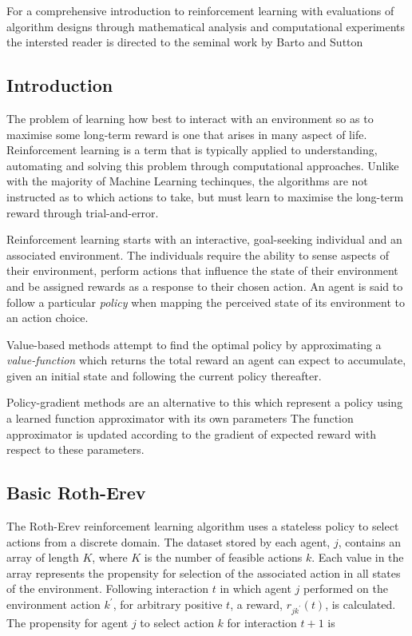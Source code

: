 For a comprehensive introduction to reinforcement learning with evaluations of
algorithm designs through mathematical analysis and computational experiments
the intersted reader is directed to the seminal work by Barto and Sutton

\subsection{Introduction}
The problem of learning how best to interact with an environment so as to
maximise some long-term reward is one that arises in many aspect of life.
Reinforcement learning is a term that is typically applied to
understanding, automating and solving this problem through computational
approaches. Unlike with the majority of Machine Learning techinques, the
algorithms are not instructed as to which actions to take, but must learn to
maximise the long-term reward through trial-and-error.

Reinforcement learning starts with an interactive, goal-seeking individual and
an associated environment.  The individuals require the ability to sense
aspects of their environment, perform actions that influence the state of their
environment and be assigned rewards as a response to their chosen action.  An
agent is said to follow a particular \textit{policy} when mapping the
perceived state of its environment to an action choice.

Value-based methods attempt to find the optimal policy by
approximating a \textit{value-function} which returns the total reward an
agent can expect to accumulate, given an initial state and following the
current policy thereafter.

Policy-gradient methods are an alternative to this which
represent a policy using a learned function approximator with its own
parameters %
The function approximator is updated according to the gradient of expected
reward with respect to these parameters.

\subsection{Basic Roth-Erev}
\label{sec:rotherev}
The Roth-Erev reinforcement learning algorithm uses a stateless policy to
select actions from a discrete domain\cite{roth:games,roth:aer}.  The dataset
stored by each agent, $j$, contains an array of length $K$, where $K$ is the
number of feasible actions $k$. Each value in the array represents the
propensity for selection of the associated action in all states of the
environment.  Following interaction $t$ in which agent $j$ performed on the
environment action $k^\prime$, for arbitrary positive $t$, a reward,
$r_{jk^\prime}(t)$, is calculated.  The propensity for agent $j$ to select
action $k$ for interaction $t+1$ is

